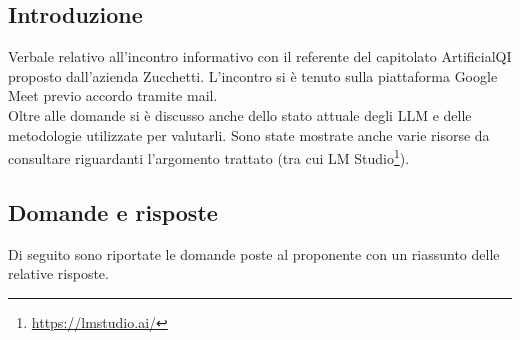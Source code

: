 \documentclass[10pt]{article}
\begin{document}
\subsection{Introduzione}
Verbale relativo all'incontro informativo con il referente del capitolato ArtificialQI proposto dall'azienda Zucchetti.
L'incontro si è tenuto sulla piattaforma Google Meet previo accordo tramite mail. \\
Oltre alle domande si è discusso anche dello stato attuale degli LLM e delle metodologie utilizzate per valutarli. Sono state mostrate anche varie risorse da consultare riguardanti l'argomento trattato (tra cui LM Studio\footnote{\url{https://lmstudio.ai/}}).
\subsection{Domande e risposte}
Di seguito sono riportate le domande poste al proponente con un riassunto delle relative risposte.
\end{document}
